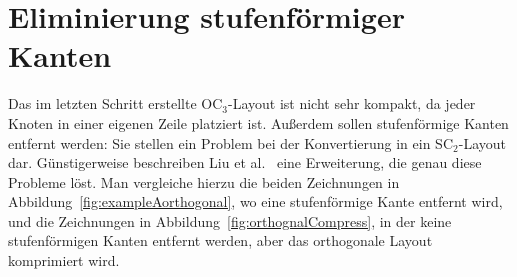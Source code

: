\documentclass[a4paper]{scrreprt}
\theoremstyle{definition}
\begin{document}
\section{Eliminierung stufenförmiger Kanten}
\label{sec:sEdgeRemoveAlgo}

Das im letzten Schritt erstellte OC$_3$-Layout ist nicht sehr kompakt, da jeder Knoten in einer eigenen Zeile platziert ist. Außerdem sollen stufenförmige Kanten entfernt werden: Sie stellen ein Problem bei der Konvertierung in ein SC$_2$-Layout dar. Günstigerweise beschreiben Liu et al.~\cite{liu+etal-98} eine Erweiterung, die genau diese Probleme löst. Man vergleiche hierzu die beiden Zeichnungen in Abbildung~\ref{fig:exampleAorthogonal}, wo eine stufenförmige Kante entfernt wird, und die Zeichnungen in Abbildung~\ref{fig:orthognalCompress}, in der keine stufenförmigen Kanten entfernt werden, aber das orthogonale Layout komprimiert wird.
\end{document}
